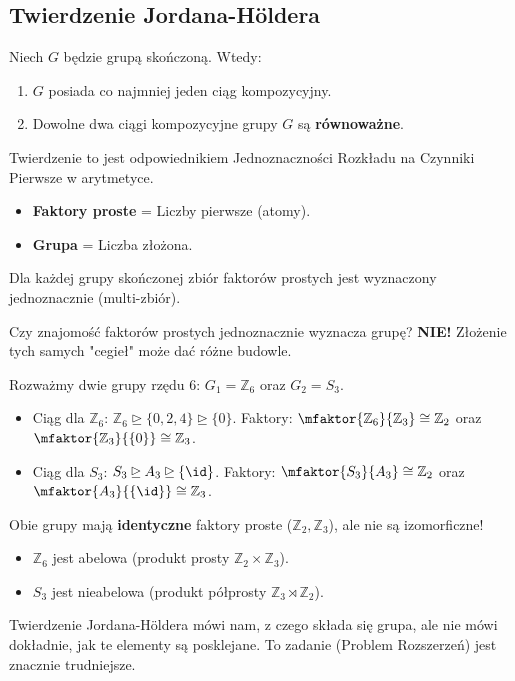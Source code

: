 \subsection{Twierdzenie Jordana-Höldera}

\begin{theorem}
	Niech $G$ będzie grupą skończoną. Wtedy:
	\begin{enumerate}
		\item $G$ posiada co najmniej jeden ciąg kompozycyjny.
		\item Dowolne dwa ciągi kompozycyjne grupy $G$ są \textbf{równoważne}.
	\end{enumerate}
\end{theorem} 

\begin{remark}
	Twierdzenie to jest odpowiednikiem Jednoznaczności Rozkładu na Czynniki Pierwsze w arytmetyce.
	\begin{itemize}
		\item \textbf{Faktory proste} = Liczby pierwsze (atomy).
		\item \textbf{Grupa} = Liczba złożona.
	\end{itemize}
	Dla każdej grupy skończonej zbiór faktorów prostych jest wyznaczony jednoznacznie (multi-zbiór).
\end{remark}

\begin{question}
	Czy znajomość faktorów prostych jednoznacznie wyznacza grupę?
	\textbf{NIE!} Złożenie tych samych "cegieł" może dać różne budowle.
\end{question}

\begin{eg}
	Rozważmy dwie grupy rzędu 6: $G_1 = \mathbb{Z}_6$ oraz $G_2 = S_3$.
	\begin{itemize}
		\item Ciąg dla $\mathbb{Z}_6$: $\mathbb{Z}_6 \unrhd \{0, 2, 4\} \unrhd \{0\}$.
		Faktory: $\mfaktor{\mathbb{Z}_6}{\mathbb{Z}_3} \cong \mathbb{Z}_2$ oraz $\mfaktor{\mathbb{Z}_3}{\{0\}} \cong \mathbb{Z}_3$.
		
		\item Ciąg dla $S_3$: $S_3 \unrhd A_3 \unrhd \{\id\}$.
		Faktory: $\mfaktor{S_3}{A_3} \cong \mathbb{Z}_2$ oraz $\mfaktor{A_3}{\{\id\}} \cong \mathbb{Z}_3$.
	\end{itemize}
	Obie grupy mają \textbf{identyczne} faktory proste ($\mathbb{Z}_2, \mathbb{Z}_3$), ale nie są izomorficzne!
	\begin{itemize}
		\item $\mathbb{Z}_6$ jest abelowa (produkt prosty $\mathbb{Z}_2 \times \mathbb{Z}_3$).
		\item $S_3$ jest nieabelowa (produkt półprosty $\mathbb{Z}_3 \rtimes \mathbb{Z}_2$).
	\end{itemize}
\end{eg}

\begin{summary}
	Twierdzenie Jordana-Höldera mówi nam, z czego składa się grupa, ale nie mówi dokładnie, jak te elementy są posklejane. To zadanie (Problem Rozszerzeń) jest znacznie trudniejsze.
\end{summary}
